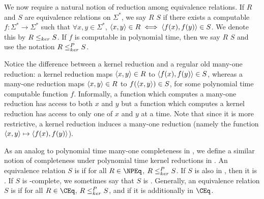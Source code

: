 We now require a natural notion of reduction among equivalence relations.
If $R$ and $S$ are equivalence relations on $\Sigma^*$, we say $R$  $S$ if there exists a computable $f\colon\Sigma^*\to\Sigma^*$ such that $\forall x,y\in\Sigma^*$, $\left\langle x,y\right\rangle\in R\iff \left\langle f(x),f(y)\right\rangle\in S$.
We denote this by $R\leq_{ker} S$.
If $f$ is computable in polynomial time, then we say $R$  $S$ and use the notation $R\leq^{P}_{ker} S$.

Notice the difference between a kernel reduction and a regular old many-one reduction: a kernel reduction maps $\left\langle x,y\right\rangle\in R$ to $\left\langle f(x),f(y)\right\rangle\in S$, whereas a many-one reduction maps $\left\langle x,y\right\rangle\in R$ to $f(\left\langle x,y\right\rangle)\in S$, for some polynomial time computable function $f$.
Informally, a function which computes a many-one reduction has access to both $x$ and $y$ but a function which computes a kernel reduction has access to only one of $x$ and $y$ at a time.
Note that since it is more restrictive, a kernel reduction induces a many-one reduction (namely the function $\left\langle x,y\right\rangle\mapsto\left\langle f(x),f(y)\right\rangle$).

As an analog to polynomial time many-one completeness in \NP, we define a similar notion of completeness under polynomial time kernel reductions in \NPEq.
An equivalence relation $S$ is  if for all $R\in\NPEq$, $R\leq^{P}_{ker} S$.
If $S$ is also in \NPEq, then it is .
If $S$ is \NPEq-complete, we sometimes say that $S$ is .
Generally, an equivalence relation $S$ is  if for all $R\in\CEq$, $R\leq^{P}_{ker} S$, and  if it is additionally in $\CEq$.
